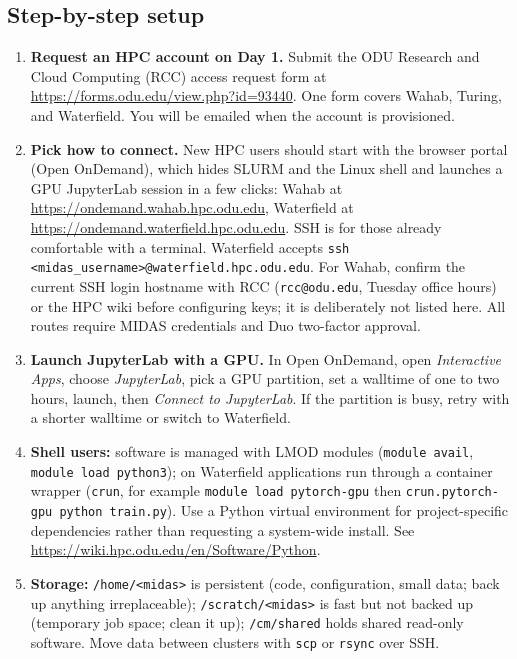 \documentclass[11pt]{article}
\theoremstyle{remark}
\begin{document}
\subsection{Step-by-step setup}

\begin{enumerate}[leftmargin=1.5em,itemsep=2pt]
  \item \textbf{Request an HPC account on Day 1.} Submit the ODU Research and Cloud Computing (RCC) access request form at \url{https://forms.odu.edu/view.php?id=93440}. One form covers Wahab, Turing, and Waterfield. You will be emailed when the account is provisioned.
  \item \textbf{Pick how to connect.} New HPC users should start with the browser portal (Open OnDemand), which hides SLURM and the Linux shell and launches a GPU JupyterLab session in a few clicks: Wahab at \url{https://ondemand.wahab.hpc.odu.edu}, Waterfield at \url{https://ondemand.waterfield.hpc.odu.edu}. SSH is for those already comfortable with a terminal. Waterfield accepts \texttt{ssh <midas\_username>@waterfield.hpc.odu.edu}. For Wahab, confirm the current SSH login hostname with RCC (\texttt{rcc@odu.edu}, Tuesday office hours) or the HPC wiki before configuring keys; it is deliberately not listed here. All routes require MIDAS credentials and Duo two-factor approval.
  \item \textbf{Launch JupyterLab with a GPU.} In Open OnDemand, open \emph{Interactive Apps}, choose \emph{JupyterLab}, pick a GPU partition, set a walltime of one to two hours, launch, then \emph{Connect to JupyterLab}. If the partition is busy, retry with a shorter walltime or switch to Waterfield.
  \item \textbf{Shell users:} software is managed with LMOD modules (\texttt{module avail}, \texttt{module load python3}); on Waterfield applications run through a container wrapper (\texttt{crun}, for example \texttt{module load pytorch-gpu} then \texttt{crun.pytorch-gpu python train.py}). Use a Python virtual environment for project-specific dependencies rather than requesting a system-wide install. See \url{https://wiki.hpc.odu.edu/en/Software/Python}.
  \item \textbf{Storage:} \texttt{/home/<midas>} is persistent (code, configuration, small data; back up anything irreplaceable); \texttt{/scratch/<midas>} is fast but not backed up (temporary job space; clean it up); \texttt{/cm/shared} holds shared read-only software. Move data between clusters with \texttt{scp} or \texttt{rsync} over SSH.
\end{enumerate}
\end{document}
